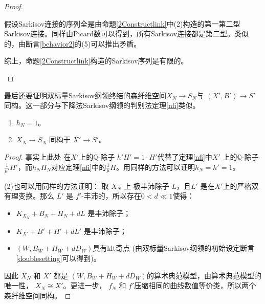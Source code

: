 \begin{proof}
\begin{enumerate}
      假设Sarkisov连接的序列全是由命题\ref{2Constructlink}中(2)构造的第一第二型Sarkisov连接。同样由Picard数可以得到，所有Sarkisov连接都是第二型。类似的，由断言\ref{behavior2}的(5)可以推出矛盾。

      综上，命题\ref{2Constructlink}构造的Sarkisov序列是有限的。
  \end{enumerate}
\end{proof}
最后还要证明双标量Sarkisov纲领终结的森纤维空间$X_{N}\to S_{N}$与 $(X',B')\to S'$同构。这一部分与下降法Sarkisov纲领的判别法定理\ref{nfi}类似。
\begin{proposition}\label{nfi2}
  \begin{enumerate}
    \item $h_{N}=1$。
    \item $X_{N}\to S_{N}$ 同构于 $X'\to S'$。
  \end{enumerate}
\end{proposition}
\begin{proof}
  事实上此处 在$X'$上的$\mathbb{Q}$-除子 $h'H'=1\cdot H'$代替了定理\ref{nfi}中$X'$ 上的$\mathbb{Q}$-除子$ \frac{1}{\mu'}H'$，而$h_{N}H_{N}$对应定理\ref{nfi}中的$ \frac{1}{\mu}H$。用同样的方法可以证明$ h_{N}=h'=1 $。

  (2)也可以用同样的方法证明：
  取 $X_{N}$ 上  极丰沛除子 $ L $，且$L'  $ 是在$ X' $上的严格双有理变换。那么  $ L' $ 是 $ f' $-丰沛的，所以存在$ 0<d\ll1 $使得：
  \begin{itemize}
    \item $ K_{X_{N}}+B_{N}+H_{N}+dL $ 是丰沛除子；
    \item $ K_{X'}+B'+H'+dL' $ 是丰沛除子；
    \item $(W,B_{W}+H_{W}+dD_{W})$具有klt奇点 (由双标量Sarkisov纲领的初始设定断言\ref{doublesetting}可以得到)。
  \end{itemize}
  因此 $X_{N}$ 和 $X'$ 都是 $(W,B_{W}+H_{W}+dD_{W})$的算术典范模型，由算术典范模型的唯一性， $X_{N}\cong X'$。更进一步， $f_{N}$ 和  $f'$压缩相同的曲线数值等价类，所以两个森纤维空间同构。
\end{proof}
